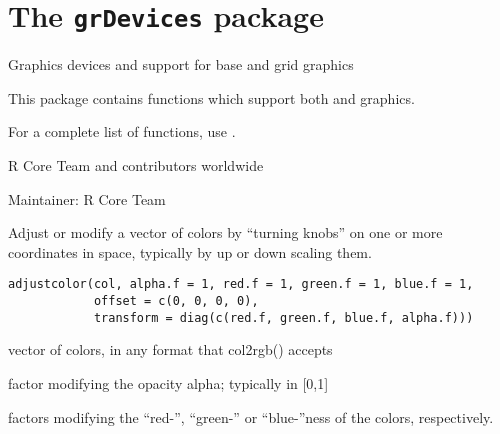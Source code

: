 
\chapter{The \texttt{grDevices} package}
%
\begin{Description}\relax
Graphics devices and support for base and grid graphics
\end{Description}
%
\begin{Details}\relax

This package contains functions which support both
 and  graphics.

For a complete list of functions, use .

\end{Details}
%
\begin{Author}\relax
R Core Team and contributors worldwide

Maintainer: R Core Team 
\end{Author}
%
\begin{Description}\relax
Adjust or modify a vector of colors by ``turning knobs'' on one or more
coordinates in  space, typically by up or down
scaling them.
\end{Description}
%
\begin{Usage}
\begin{verbatim}
adjustcolor(col, alpha.f = 1, red.f = 1, green.f = 1, blue.f = 1,
            offset = c(0, 0, 0, 0),
            transform = diag(c(red.f, green.f, blue.f, alpha.f)))
\end{verbatim}
\end{Usage}
%
\begin{Arguments}
\begin{ldescription}
\item[\code{col}] vector of colors, in any format that col2rgb() accepts
\item[\code{alpha.f}] factor modifying the opacity alpha; typically in [0,1]
\item[\code{red.f, green.f, blue.f}] factors modifying the ``red-'',
``green-'' or ``blue-''ness of the colors, respectively.
\item[\code{offset}] 

\item[\code{transform}] 

\end{ldescription}
\end{Arguments}
